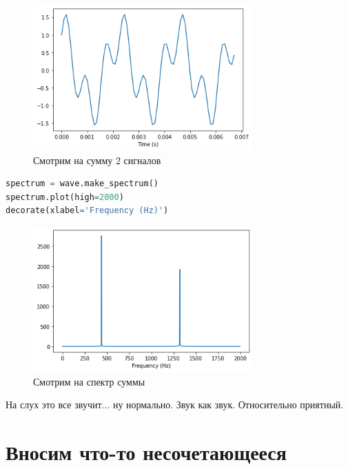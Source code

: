 \documentclass[a4paper,12pt]{report}
\begin{document}
    \begin{figure}[H]
        \centering
        \includegraphics[width=0.75\textwidth]{ex3_sum_of_2_multiples.png}
        \caption{Смотрим на сумму 2 сигналов}
        \label{fig:ex3_sum_of_2_multiples}
    \end{figure}
    
\begin{lstlisting}[language=Python,caption=Смотрим на спектр 2 сигналов]
spectrum = wave.make_spectrum()
spectrum.plot(high=2000)
decorate(xlabel='Frequency (Hz)')
\end{lstlisting}

    \begin{figure}[H]
        \centering
        \includegraphics[width=0.75\textwidth]{ex3_spectrum_of_2_multiples.png}
        \caption{Смотрим на спектр суммы}
        \label{fig:ex3_spectrum_of_2_multiples}
    \end{figure}
    
    На слух это все звучит... ну нормально. Звук как звук. Относительно приятный.
    
    \section{Вносим что-то несочетающееся}
    
\end{document}
